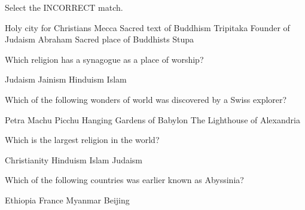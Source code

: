


\begin{center}
\end{center}

\begin{questions}
    \question Select the INCORRECT match.

    \begin{randomizechoices}
        \CorrectChoice Holy city for Christians \textemdash Mecca
        \choice Sacred text of Buddhism \textemdash Tripitaka
        \choice Founder of Judaism \textemdash Abraham
        \choice Sacred place of Buddhists \textemdash Stupa
    \end{randomizechoices}

    \question Which religion has a synagogue as a place of worship?

    \begin{randomizeoneparchoices}
        \CorrectChoice Judaism
        \choice Jainism
        \choice Hinduism
        \choice Islam
    \end{randomizeoneparchoices}

    \question Which of the following wonders of world was discovered by a Swiss explorer?

    \begin{randomizeoneparchoices}
        \CorrectChoice Petra
        \choice Machu Picchu
        \choice Hanging Gardens of Babylon
        \choice The Lighthouse of Alexandria
    \end{randomizeoneparchoices}

    \question Which is the largest religion in the world?

    \begin{randomizeoneparchoices}
        \CorrectChoice Christianity
        \choice Hinduism
        \choice Islam
        \choice Judaism
    \end{randomizeoneparchoices}

    \question Which of the following countries was earlier known as Abyssinia?

    \begin{randomizeoneparchoices}
        \CorrectChoice Ethiopia
        \choice France
        \choice Myanmar
        \choice Beijing
    \end{randomizeoneparchoices}


\end{questions}
